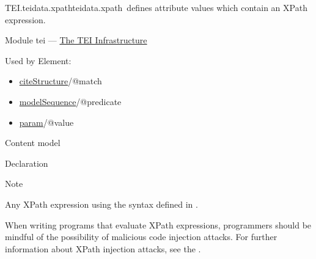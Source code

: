 \begin{reflist}
\item[]\begin{specHead}{TEI.teidata.xpath}{teidata.xpath} defines attribute values which contain an XPath expression.\end{specHead} 
    \item[{Module}]
  tei — \hyperref[ST]{The TEI Infrastructure}
    \item[{Used by}]
  Element: \begin{itemize}
\item \hyperref[TEI.citeStructure]{citeStructure}/@match
\item \hyperref[TEI.modelSequence]{modelSequence}/@predicate
\item \hyperref[TEI.param]{param}/@value
\end{itemize} 
    \item[{Content model}]
    \item[{Declaration}]
    \item[{Note}]
  \par
Any XPath expression using the syntax defined in \cite{XSLT2}.\par
When writing programs that evaluate XPath expressions, programmers should be mindful of the possibility of malicious code injection attacks. For further information about XPath injection attacks, see the .
\end{reflist}  
